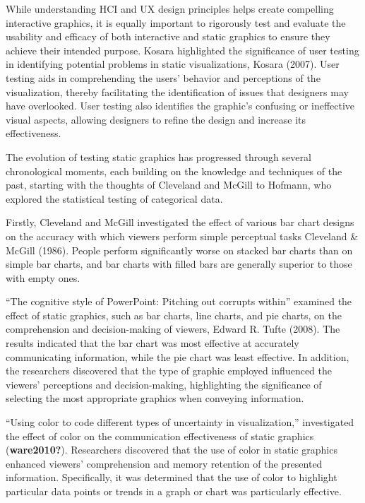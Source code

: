 \documentclass[print]{nuthesis}
\begin{document}
While understanding HCI and UX design principles helps create compelling interactive graphics, it is equally important to rigorously test and evaluate the usability and efficacy of both interactive and static graphics to ensure they achieve their intended purpose.
Kosara highlighted the significance of user testing in identifying potential problems in static visualizations, Kosara (2007).
User testing aids in comprehending the users' behavior and perceptions of the visualization, thereby facilitating the identification of issues that designers may have overlooked.
User testing also identifies the graphic's confusing or ineffective visual aspects, allowing designers to refine the design and increase its effectiveness.

The evolution of testing static graphics has progressed through several chronological moments, each building on the knowledge and techniques of the past, starting with the thoughts of Cleveland and McGill to Hofmann, who explored the statistical testing of categorical data.

Firstly, Cleveland and McGill investigated the effect of various bar chart designs on the accuracy with which viewers perform simple perceptual tasks Cleveland \& McGill (1986).
People perform significantly worse on stacked bar charts than on simple bar charts, and bar charts with filled bars are generally superior to those with empty ones.

``The cognitive style of PowerPoint: Pitching out corrupts within'' examined the effect of static graphics, such as bar charts, line charts, and pie charts, on the comprehension and decision-making of viewers, Edward R. Tufte (2008).
The results indicated that the bar chart was most effective at accurately communicating information, while the pie chart was least effective.
In addition, the researchers discovered that the type of graphic employed influenced the viewers' perceptions and decision-making, highlighting the significance of selecting the most appropriate graphics when conveying information.

``Using color to code different types of uncertainty in visualization,'' investigated the effect of color on the communication effectiveness of static graphics (\textbf{ware2010?}).
Researchers discovered that the use of color in static graphics enhanced viewers' comprehension and memory retention of the presented information.
Specifically, it was determined that the use of color to highlight particular data points or trends in a graph or chart was particularly effective.
\end{document}
